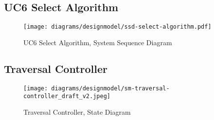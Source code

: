 \subsection{UC6 Select Algorithm}
\begin{figure}[H]
    \centering
    \texttt{[image: diagrams/designmodel/ssd-select-algorithm.pdf]}
    \caption{UC6 Select Algorithm, System Sequence Diagram}
    \label{fig:select-algorithm-ssd}
\end{figure}
% 
\subsection{Traversal Controller}
\begin{figure}[H]
    \centering
    \texttt{[image: diagrams/designmodel/sm-traversal-controller\_draft\_v2.jpeg]}
    \caption{Traversal Controller, State Diagram}
    \label{fig:traversal-controller-sm}
\end{figure}